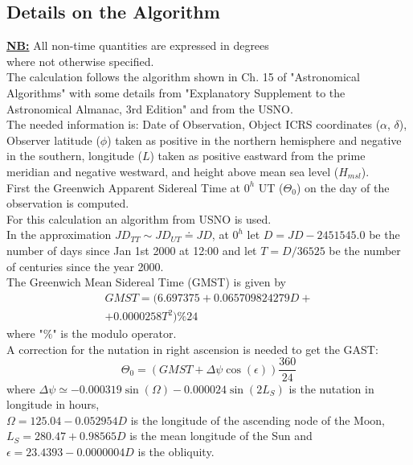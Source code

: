 \documentclass[a4paper]{article}
\begin{document}
	\begin{multicols}{2}
	\section{Details on the Algorithm}
		\underline{\textbf{NB:}} All non-time quantities are expressed in degrees\\
		\indent\indent where not otherwise specified.\\
		
		The calculation follows the algorithm shown in Ch. 15 of "Astronomical Algorithms" with some details from "Explanatory Supplement to the Astronomical Almanac, 3rd Edition" and from the USNO.\\
		
		The needed information is: Date of Observation, Object ICRS coordinates ($\alpha$, $\delta$), Observer latitude ($\phi$) taken as positive in the northern hemisphere and negative in the southern, longitude ($L$) taken as positive eastward from the prime meridian and negative westward, and height above mean sea level ($H_{msl}$).\\
		
		First the Greenwich Apparent Sidereal Time at $0^h$ UT ($\Theta_0$) on the day of the observation is computed.\\
		For this calculation an algorithm from USNO is used.\\
		In the approximation $JD_{TT} \sim JD_{UT} \doteq JD$, at $0^h$ let $D = JD - 2451545.0$ be the number of days since Jan 1st 2000 at 12:00 and let $T = D/36525$ be the number of centuries since the year 2000.\\
		The Greenwich Mean Sidereal Time (GMST) is given by
		\begin{multline*}
			GMST = (6.697375 + 0.065709824279 D+\\ + 0.0000258 T^2) \% 24
		\end{multline*}
		where "$\%$" is the modulo operator.\\
		A correction for the nutation in right ascension is needed to get the GAST:
		\begin{equation}
			\Theta_0 = (GMST + \Delta\psi \cos(\epsilon))\frac{360}{24}
		\end{equation}
		where $\Delta\psi \simeq -0.000319 \sin(\Omega) - 0.000024 \sin(2L_S)$ 
		is the nutation in longitude in hours,\\ $\Omega = 125.04 - 0.052954 D$ is the longitude of the ascending node of the Moon, $L_S = 280.47 + 0.98565 D$ is the mean longitude of the Sun and \\$\epsilon = 23.4393 - 0.0000004 D$ is the obliquity.\\
		

\end{multicols}
\end{document}
